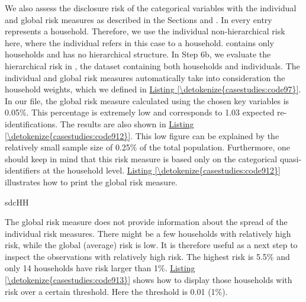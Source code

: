 \documentclass[letterpaper,10pt,english]{sphinxmanual}
\begin{document}
We also assess the disclosure risk of the categorical variables with the
individual and global risk measures as described in the Sections
 and
.
In  every entry represents a household. Therefore, we use
the individual non-hierarchical risk here, where the individual refers
in this case to a household.  contains only households and has
no hierarchical structure. In Step 6b, we evaluate the hierarchical risk
in , the dataset containing both households and individuals. The
individual and global risk measures automatically take into
consideration the household weights, which we defined in \hyperref[\detokenize{casestudies:code97}]{Listing \ref{\detokenize{casestudies:code97}}}. In
our file, the global risk measure calculated using the chosen key
variables is 0.05\%. This percentage is extremely low and corresponds to
1.03 expected re-identifications. The results are also shown in \hyperref[\detokenize{casestudies:code912}]{Listing \ref{\detokenize{casestudies:code912}}}.
This low figure can be explained by the relatively small sample
size of 0.25\% of the total population. Furthermore, one should keep in
mind that this risk measure is based only on the categorical
quasi-identifiers at the household level. \hyperref[\detokenize{casestudies:code912}]{Listing \ref{\detokenize{casestudies:code912}}} illustrates how
to print the global risk measure.

\def\sphinxLiteralBlockLabel{\label{\detokenize{casestudies:code912}}}
%
\begin{sphinxVerbatim}[commandchars=\\\{\},numbers=left,firstnumber=1,stepnumber=1]
sdcHH 

\end{sphinxVerbatim}

The global risk measure does not provide information about the spread of
the individual risk measures. There might be a few households with
relatively high risk, while the global (average) risk is low. It is
therefore useful as a next step to inspect the observations with
relatively high risk. The highest risk is 5.5\% and only 14 households
have risk larger than 1\%. \hyperref[\detokenize{casestudies:code913}]{Listing \ref{\detokenize{casestudies:code913}}} shows how to display those
households with risk over a certain threshold. Here the threshold is
0.01 (1\%).
\end{document}
